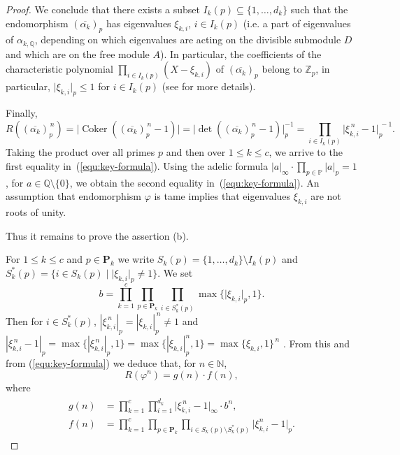 \documentclass[12pt, a4paper]{amsart}
\def\a{\alpha}
\def\Coker{\operatorname{Coker}}
\begin{document}
\begin{proof}
 We conclude that
 there exists a subset $I_k(p) \subseteq \{1,\ldots,d_k\}$
 such that the endomorphism $(\overline{\a_k})_p$ has eigenvalues $\xi_{k,i}$, $i \in I_k(p)$
 (i.e. a part of eigenvalues of $\a_{k,\mathbb{Q}}$,
 depending on which eigenvalues are acting on the divisible submodule $D$ and which are on the free module $A$).
 In particular, the coefficients of the characteristic polynomial
 $\prod_{i \in I_k(p)} (X - \xi_{k,i})$ of  $(\overline{\a_k})_p$
 belong to  $\mathbb{Z}_p$,  in particular, $\lvert \xi_{k,i} \rvert_p  \le 1$ for
 $i \in I_k(p)$  (see \cite[Prop. 3.4]{FelsKlop} for more details).

 Finally,
 \[
   R((\overline{\a_k})_p^{\, n})
   = \lvert \Coker((\overline{\a_k})_p^{\, n} - 1)  \rvert
   = \lvert \det( (\overline{\a_k})_p^{\, n} - 1) \rvert_p^{-1}
   = \prod_{i \in I_k(p)} \lvert \xi_{k,i}^{\, n}-1 \rvert_p^{\,-1}.
 \]
 Taking the product over all primes $p$ and then over $1 \le k \le c$, we arrive to the first equality
 in~(\ref{equ:key-formula}).  Using the adelic formula
 $\lvert a \rvert_\infty \cdot \prod_{p \in \mathbb{P}} \lvert a \rvert_p =
 1$,
 for $a \in \mathbb{Q} \setminus \{0\}$, we obtain the second
 equality in~(\ref{equ:key-formula}).
 An assumption that endomorphism $\varphi$ is   tame  implies that eigenvalues $\xi_{k,i}$ are not roots of unity.

 Thus it remains to prove the assertion (b).

 For $1 \le k \le c$ and $p \in \mathbf{P}_k$ we write
 $S_k(p) = \{1, \ldots, d_k\} \setminus I_k(p)$ and
 $S^*_k(p) = \{i \in S_k(p) \mid \lvert \xi_{k,i} \rvert_p \neq 1\}$.  We set
 $$
   b = \prod_{k=1}^c \prod_{p \in \mathbf{P}_k} \prod_{i \in
     S^*_k(p)} \max \{ \lvert \xi_{k,i} \rvert_p, 1\}.
 $$
 Then for $i \in S^*_k(p)$, $|\xi_{k,i}^{\, n}|_p=|\xi_{k,i}|_p^{\, n} \ne 1$ and
 $|\xi_{k,i}^{\, n}-1|_p=\max\{|\xi_{k,i}^{\, n}|_p,1\}
  =\max\{|\xi_{k,i}|_p^{n},1\}
  =\max\{\xi_{k,i},1\}^{\, n}$ .
 From this  and from (\ref{equ:key-formula})  we deduce  that, for $n \in \mathbb{N}$,
  $$
    R(\varphi^n) = g(n) \cdot f(n),
  $$
 where
 \begin{align}\label{eq:gif}
 \begin{split}
    g(n) &= \prod_{k=1}^c \prod_{i=1}^{d_k}
    \lvert \xi_{k,i}^{\, n} - 1 \rvert_\infty \cdot  b^n,\\
     f(n) &= \prod_{k=1}^c \prod_{p \in \mathbf{P}_k}
    \prod_{i \in S_k(p) \setminus S^*_k(p)} \big\vert \xi_{k,i}^n - 1 \big\vert_p.
 \end{split}
 \end{align}


\end{proof}
\end{document}
